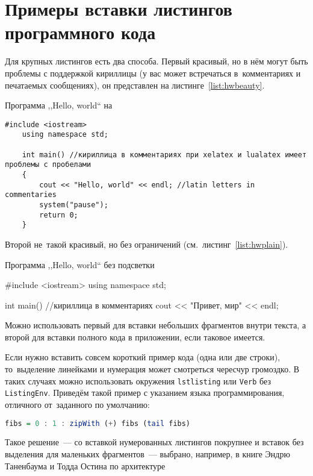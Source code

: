 \chapter{Примеры вставки листингов программного кода} \label{AppendixA}

Для крупных листингов есть два способа. Первый красивый, но в нём могут быть
проблемы с поддержкой кириллицы (у вас может встречаться в~комментариях
и печатаемых сообщениях), он представлен на листинге~\ref{list:hwbeauty}.
\begin{ListingEnv}[!h]%
    \captiondelim{ } %
    \caption{Программа ,,Hello, world`` на \protect\cpp}
    \label{list:hwbeauty}
    \begin{lstlisting}[language={[ISO]C++}]
	#include <iostream>
	using namespace std;

	int main() //кириллица в комментариях при xelatex и lualatex имеет проблемы с пробелами
	{
		cout << "Hello, world" << endl; //latin letters in commentaries
		system("pause");
		return 0;
	}
    \end{lstlisting}
\end{ListingEnv}%
Второй не~такой красивый, но без ограничений (см.~листинг~\ref{list:hwplain}).
\begin{ListingEnv}[!h]
    \captiondelim{ } %
    \caption{Программа ,,Hello, world`` без подсветки}
    \label{list:hwplain}
    \begin{Verb}

        #include <iostream>
        using namespace std;
        
        int main() //кириллица в комментариях
        {
            cout << "Привет, мир" << endl;
        }
    \end{Verb}
\end{ListingEnv}

Можно использовать первый для вставки небольших фрагментов
внутри текста, а второй для вставки полного
кода в приложении, если таковое имеется.

Если нужно вставить совсем короткий пример кода (одна или две строки),
то~выделение  линейками и нумерация может смотреться чересчур громоздко.
В таких случаях можно использовать окружения \texttt{lstlisting} или
\texttt{Verb} без \texttt{ListingEnv}. Приведём такой пример
с указанием языка программирования, отличного от~заданного по умолчанию:
\begin{lstlisting}[language=Haskell]
fibs = 0 : 1 : zipWith (+) fibs (tail fibs)
\end{lstlisting}
Такое решение~--- со вставкой нумерованных листингов покрупнее
и вставок без выделения для маленьких фрагментов~--- выбрано,
например, в книге Эндрю Таненбаума и Тодда Остина по архитектуре

